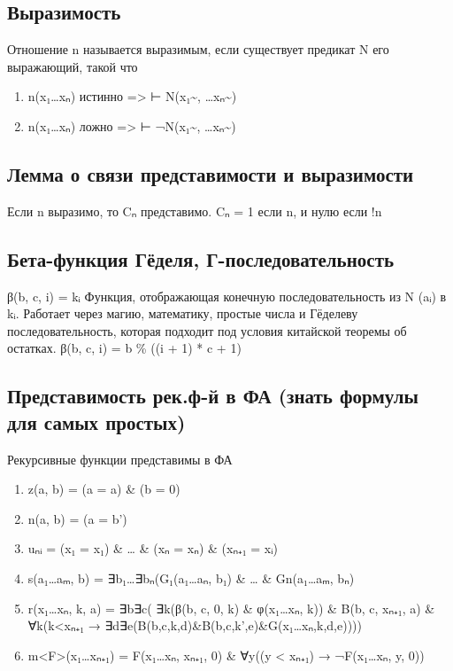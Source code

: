 \documentclass[11pt]{article}
\begin{document}
\subsection{Выразимость}
\label{sec-2-25}
Отношение n называется выразимым, если существует предикат N его
выражающий, такой что
\begin{enumerate}
\item n(x₁\ldots{}xₙ) истинно => ⊢ N(x₁\textasciitilde{}, \ldots{}xₙ\textasciitilde{})
\item n(x₁\ldots{}xₙ) ложно => ⊢ ¬N(x₁\textasciitilde{}, \ldots{}xₙ\textasciitilde{})
\end{enumerate}
\subsection{Лемма о связи представимости и выразимости}
\label{sec-2-26}
Если n выразимо, то Cₙ представимо.
Cₙ = 1 если n, и нулю если !n
\subsection{Бета-функция Гёделя, Г-последовательность}
\label{sec-2-27}
β(b, c, i) = kᵢ
Функция, отображающая конечную последовательность из N (aᵢ) в kᵢ.
Работает через магию, математику, простые числа и Гёделеву
последовательность, которая подходит под условия китайской
теоремы об остатках.
β(b, c, i) = b \% ((i + 1) * c + 1)
\subsection{Представимость рек.ф-й в ФА (знать формулы для самых простых)}
\label{sec-2-28}
Рекурсивные функции представимы в ФА
\begin{enumerate}
\item z(a, b) = (a = a) \& (b = 0)
\item n(a, b) = (a = b')
\item uₙᵢ = (x₁ = x₁) \& \ldots{} \& (xₙ = xₙ) \& (xₙ₊₁ = xᵢ)
\item s(a₁\ldots{}aₘ, b) = ∃b₁\ldots{}∃bₙ(G₁(a₁\ldots{}aₙ, b₁) \& \ldots{} \& Gn(a₁\ldots{}aₘ, bₙ)
\item r(x₁\ldots{}xₙ, k, a) =
∃b∃c(
     ∃k(β(b, c, 0, k) \& φ(x₁\ldots{}xₙ, k))
     \& B(b, c, xₙ₊₁, a)
     \& ∀k(k<xₙ₊₁ → ∃d∃e(B(b,c,k,d)\&B(b,c,k',e)\&G(x₁\ldots{}xₙ,k,d,e))))

\item m<F>(x₁\ldots{}xₙ₊₁) = F(x₁\ldots{}xₙ, xₙ₊₁, 0) \& ∀y((y < xₙ₊₁) → ¬F(x₁\ldots{}xₙ, y, 0))
\end{enumerate}
\end{document}
